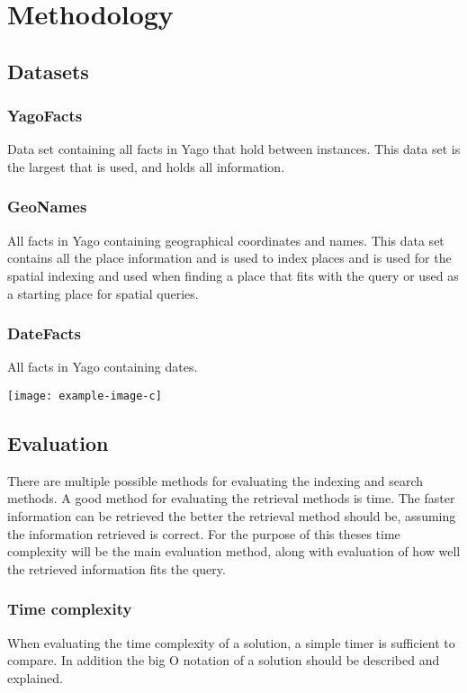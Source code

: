 
\chapter{Methodology}

\section{Datasets}
\subsection{YagoFacts}
Data set containing all facts in Yago that hold between instances. This data set is the largest that is used, and holds all information.

\subsection{GeoNames}
All facts in Yago containing geographical coordinates and names. This data set contains all the place information and is used to index places and is used for the spatial indexing and used when finding a place that fits with the query or used as a starting place for spatial queries. 

\subsection{DateFacts}
All facts in Yago containing dates.

\texttt{[image: example-image-c]}

\section{Evaluation}
There are multiple possible methods for evaluating the indexing and search methods. A good method for evaluating the retrieval methods is time. The faster information can be retrieved the better the retrieval method should be, assuming the information retrieved is correct. For the purpose of this theses time complexity will be the main evaluation method, along with evaluation of how well the retrieved information fits the query.



\subsection{Time complexity}
When evaluating the time complexity of a solution, a simple timer is sufficient to compare. In addition the big O notation of a solution should be described and explained.

